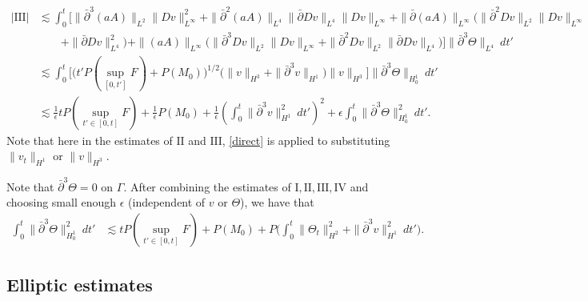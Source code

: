 \documentclass[12pt,a4paper]{amsart}
\numberwithin{equation}{section}
\theoremstyle{plain}
\theoremstyle{definition}
\newcommand{\bpartial}{\bar{\partial}}
\begin{document}
\begin{align*}
|\mathrm{III}|
&\lesssim \int_{0}^{t} \Big[ \|\bpartial^3 (aA)\|_{L^2}  \|Dv\|_{L^{\infty}}^2
            + \|\bpartial^2 (aA)\|_{L^4}\|\bpartial Dv\|_{L^4} \|Dv\|_{L^{\infty}}
            +\|\bpartial (aA)\|_{L^{\infty}} \Big(\|\bpartial^2 Dv\|_{L^2} \|Dv\|_{L^{\infty}}\\
            &\qquad+\|\bpartial Dv\|_{L^4}^2\Big)
            + \| (aA)\|_{L^{\infty}} \Big(\|\bpartial^3 Dv\|_{L^2} \|Dv\|_{L^{\infty}}+\|\bpartial^2 Dv\|_{L^2} \|\bpartial Dv\|_{L^4} \Big) \Big] \|\bpartial^3\Theta\|_{L^4} \ dt'\\
&\lesssim \int_{0}^{t} \Big[ \Big( t'P(\sup\limits_{[0,t']}F)+P(M_0)  \Big)^{1/2}
          \Big(\|v\|_{H^3}+ \|\bpartial^3 v\|_{H^1}\Big) \|v\|_{H^3}
           \Big] \|\bpartial^3 \Theta\|_{H_0^1} \ dt'\\
&\lesssim  \frac{1}{\epsilon}tP(\sup\limits_{t'\in[0,t]}F)+\frac{1}{\epsilon}P(M_0)+\frac{1}{\epsilon}\left(\int_{0}^{t} \|\bpartial^3 v\|_{H^1}^2\ dt'\right)^2+\epsilon \int_{0}^{t}\|\bpartial^3\Theta\|_{H_0^1}^2\ dt'.
\end{align*}
Note that here in the estimates of $\mathrm{II}$ and $\mathrm{III}$, \eqref{direct} is applied to substituting $\|v_t\|_{H^1}$ or $\|v\|_{H^3}$.

Note that $\bpartial^3 \Theta=0$ on $\Gamma$.
After combining the estimates of $\mathrm{I}, \mathrm{II}, \mathrm{III}, \mathrm{IV}$ 
and choosing small enough $\epsilon$ (independent of $v$ or $\Theta$), 
we have that
\begin{equation}\label{thetaxxx}
\begin{aligned}
\int_{0}^{t}\|\bpartial^3 \Theta\|_{H_0^1}^2\ dt'
&\lesssim tP(\sup\limits_{t'\in[0,t]}F)+P(M_0)+P \Big(\int_{0}^{t} \|\Theta_t\|_{H^2}^2+\|\bpartial^3 v\|_{H^1}^2 \ dt'\Big).
\end{aligned}
\end{equation}


\vspace{0.3cm}


\subsection{Elliptic estimates}~
\end{document}
